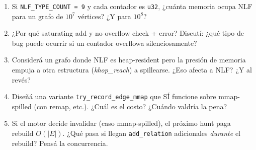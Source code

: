 \begin{ejercicios}
\begin{enumerate}
    \item \starred{} Si \texttt{NLF\_TYPE\_COUNT = 9} y cada
    contador es \texttt{u32}, ¿cuánta memoria ocupa NLF para un
    grafo de $10^7$ vértices? ¿Y para $10^8$?

    \item ¿Por qué saturating add y no overflow check + error?
    Discutí: ¿qué tipo de bug puede ocurrir si un contador
    overflowa silenciosamente?

    \item \starred{} Considerá un grafo donde NLF es heap-resident
    pero la presión de memoria empuja a otra estructura
    (\emph{khop\_reach}) a spillearse. ¿Eso afecta a NLF? ¿Y al
    revés?

    \item Diseñá una variante \texttt{try\_record\_edge\_mmap}
    que SÍ funcione sobre mmap-spilled (con remap, etc.). ¿Cuál es
    el costo? ¿Cuándo valdría la pena?

    \item Si el motor decide invalidar (caso mmap-spilled), el
    próximo hunt paga rebuild $O(|E|)$. ¿Qué pasa si llegan
    \texttt{add\_relation} adicionales \emph{durante} el rebuild?
    Pensá la concurrencia.
\end{enumerate}
\end{ejercicios}
